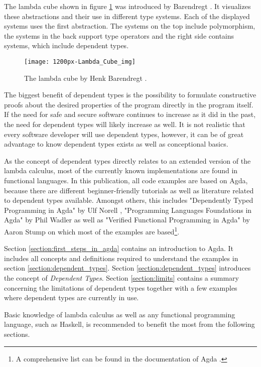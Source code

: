 The lambda cube shown in figure \ref{fig:lambda_cube} was introduced by Barendregt \cite{lambda_cube}. It visualizes these abstractions and their use in different type systems. Each of the displayed systems uses the first abstraction. 
The systems on the top include polymorphism, the systems in the back support type operators and the right side contains systems, which include dependent types.
\begin{figure}[h]
\centering
\texttt{[image: 1200px-Lambda\_Cube\_img]}
\caption{The lambda cube by Henk Barendregt \cite{lambda_cube}.}
\label{fig:lambda_cube}
\end{figure}

The biggest benefit of dependent types is the possibility to formulate constructive proofs about the desired properties of the program directly in the program itself.
If the need for safe and secure software continues to increase as it did in the past, the need for dependent types will likely increase as well.
It is not realistic that every software developer will use dependent types, however, it can be of great advantage to know dependent types exists as well as conceptional basics.

As the concept of dependent types directly relates to an extended version of the lambda calculus, most of the currently known implementations are found in functional languages.
In this publication, all code examples are based on Agda, because there are different beginner-friendly tutorials as well as literature related to dependent types available. 
Amongst others, this includes "Dependently Typed Programming in Agda" by Ulf Norell \cite{norell:deptyped}, "Programming Languages Foundations in Agda" by Phil Wadler \cite{plfa2019} as well as "Verified Functional Programming in Agda" by Aaron Stump \cite{10.1145/2841316} on which most of the examples are based\footnote{A comprehensive list can be found in the documentation of Agda \cite{AgdaReadTheDocs}.}.

Section \ref{section:first_steps_in_agda} contains an introduction to Agda.
It includes all concepts and definitions required to understand the examples in section \ref{section:dependent_types}.
Section \ref{section:dependent_types} introduces the concept of \emph{Dependent Types}.
Section \ref{section:limits} contains a summary concerning the limitations of dependent types together with a few examples where dependent types are currently in use.

Basic knowledge of lambda calculus as well as any functional programming language, such as Haskell, is recommended to benefit the most from the following sections.
